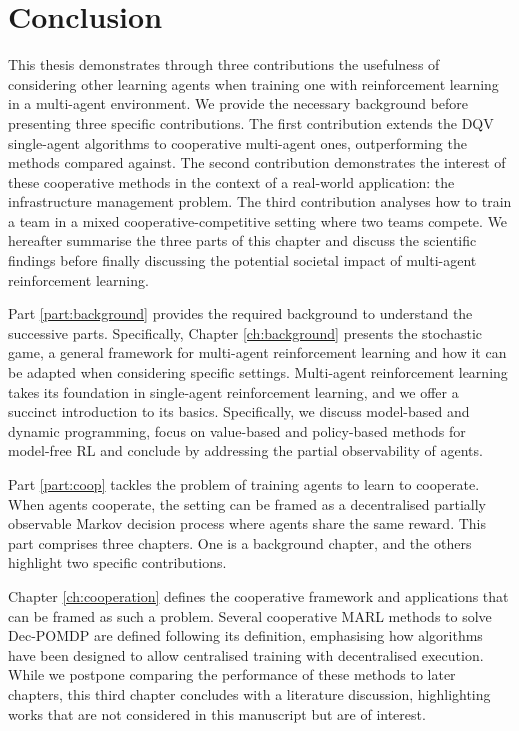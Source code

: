 \chapter{Conclusion}\label{ch:conclusion}

This thesis demonstrates through three contributions the usefulness of considering other learning agents when training one with reinforcement learning in a multi-agent environment.
We provide the necessary background before presenting three specific contributions.
The first contribution extends the DQV single-agent algorithms to cooperative multi-agent ones, outperforming the methods compared against.
The second contribution demonstrates the interest of these cooperative methods in the context of a real-world application: the infrastructure management problem.
The third contribution analyses how to train a team in a mixed cooperative-competitive setting where two teams compete.
We hereafter summarise the three parts of this chapter and discuss the scientific findings before finally discussing the potential societal impact of multi-agent reinforcement learning.

Part \ref{part:background} provides the required background to understand the successive parts.
Specifically, Chapter \ref{ch:background} presents the stochastic game, a general framework for multi-agent reinforcement learning and how it can be adapted when considering specific settings.
Multi-agent reinforcement learning takes its foundation in single-agent reinforcement learning, and we offer a succinct introduction to its basics.
Specifically, we discuss model-based and dynamic programming, focus on value-based and policy-based methods for model-free RL and conclude by addressing the partial observability of agents.

Part \ref{part:coop} tackles the problem of training agents to learn to cooperate.
When agents cooperate, the setting can be framed as a decentralised partially observable Markov decision process where agents share the same reward.
This part comprises three chapters.
One is a background chapter, and the others highlight two specific contributions.

Chapter \ref{ch:cooperation} defines the cooperative framework and applications that can be framed as such a problem.
Several cooperative MARL methods to solve Dec-POMDP are defined following its definition, emphasising how algorithms have been designed to allow centralised training with decentralised execution.
While we postpone comparing the performance of these methods to later chapters, this third chapter concludes with a literature discussion, highlighting works that are not considered in this manuscript but are of interest.

